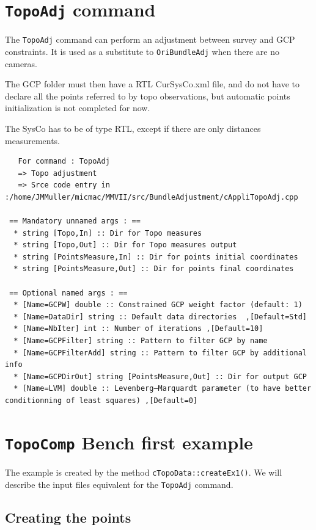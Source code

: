 \section{{\tt TopoAdj} command}

The {\tt TopoAdj} command can perform an adjustment between survey and GCP constraints.
It is used as a substitute to {\tt OriBundleAdj} when there are no cameras.

The GCP folder must then have a RTL CurSysCo.xml file, and do not have to declare all the points
referred to by topo observations, but automatic points initialization is not completed for now.

The SysCo has to be of type RTL, except if there are only distances measurements.

\begin{verbatim}
   For command : TopoAdj 
   => Topo adjustment
   => Srce code entry in :/home/JMMuller/micmac/MMVII/src/BundleAdjustment/cAppliTopoAdj.cpp

 == Mandatory unnamed args : ==
  * string [Topo,In] :: Dir for Topo measures
  * string [Topo,Out] :: Dir for Topo measures output
  * string [PointsMeasure,In] :: Dir for points initial coordinates
  * string [PointsMeasure,Out] :: Dir for points final coordinates

 == Optional named args : ==
  * [Name=GCPW] double :: Constrained GCP weight factor (default: 1)
  * [Name=DataDir] string :: Default data directories  ,[Default=Std]
  * [Name=NbIter] int :: Number of iterations ,[Default=10]
  * [Name=GCPFilter] string :: Pattern to filter GCP by name
  * [Name=GCPFilterAdd] string :: Pattern to filter GCP by additional info
  * [Name=GCPDirOut] string [PointsMeasure,Out] :: Dir for output GCP
  * [Name=LVM] double :: Levenberg–Marquardt parameter (to have better conditionning of least squares) ,[Default=0]

\end{verbatim}



\section{\texttt{TopoComp} Bench first example}
\label{subsec:topoBench}

The example is created by the method \texttt{cTopoData::createEx1()}.
We will describe the input files equivalent for the \texttt{TopoAdj} command.


\subsection{Creating the points}

